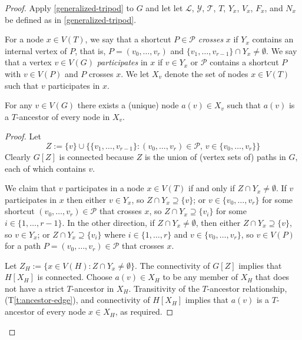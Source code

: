 \documentclass{patmorin}
\newcommand{\tref}[1]{(T\ref{t:#1})}
\begin{document}
\begin{proof}
Apply \cref{generalized-tripod} to $G$ and let 
let $\mathcal{L}$, $\mathcal{Y}$, $\mathcal{T}$, $T$, $Y_x$, $V_x$, $F_x$, and $N_x$ be defined as in \cref{generalized-tripod}.

For a node $x\in V(T)$, we say that a shortcut $P\in\mathcal{P}$ \emph{crosses} $x$ if $Y_x$ contains an internal vertex of $P$, that is, $P=(v_0,\ldots,v_r)$ and $\{v_1,\ldots,v_{r-1}\}\cap Y_x\neq\emptyset$.  We say that a vertex $v\in V(G)$ \emph{participates} in $x$ if $v\in Y_x$ or $\mathcal{P}$ contains a shortcut $P$ with $v\in V(P)$ and $P$ crosses $x$. We let $X_v$ denote the set of nodes $x\in V(T)$ such that $v$ participates in $x$.

\begin{clm}\label{x-v-ancestor}
  For any $v\in V(G)$ there exists a (unique) node $a(v)\in X_v$ such that
  $a(v)$ is a $T$-ancestor of every node in $X_v$.
\end{clm}

\begin{proof}
  Let 
  \[
     Z := \{v\} \cup \{\{v_1,\ldots,v_{r-1}\}:\mbox{$(v_0,\ldots,v_r)\in\mathcal{P}$, $v\in \{v_0,\ldots,v_r\}$}\}
  \]
  Clearly $G[Z]$ is connected because $Z$ is the union of (vertex sets of) paths in $G$, each of which contains $v$. 
  
  We claim that $v$ participates in a node $x\in V(T)$ if and only if $Z\cap Y_x\neq\emptyset$.  If $v$ participates in $x$ then either $v\in Y_x$, so $Z\cap Y_x\supseteq\{v\}$; or $v\in \{v_0,\ldots,v_r\}$ for some shortcut $(v_0,\ldots,v_r)\in\mathcal{P}$ that crosses $x$, so $Z\cap Y_x\supseteq \{v_i\}$ for some $i\in\{1,\ldots,r-1\}$.  In the other direction, if $Z\cap Y_x\neq\emptyset$, then either $Z\cap Y_x\supseteq \{v\}$, so $v\in Y_x$; or $Z\cap Y_x\supseteq \{v_i\}$ where $i\in\{1,\ldots,r\}$ and $v\in\{v_0,\ldots,v_r\}$, so $v\in V(P)$ for a path $P=(v_0,\ldots,v_r)\in\mathcal{P}$ that crosses $x$. 

  Let $Z_H:=\{x\in V(H): Z\cap Y_x\neq\emptyset\}$.  The connectivity of $G[Z]$ implies that $H[X_H]$ is connected.  
  Choose $a(v)\in X_H$ to be any member of $X_H$ that does not have a strict $T$-ancestor in $X_H$.  Transitivity of the $T$-ancestor relationship, \tref{ancestor-edge}, and connectivity of $H[X_H]$ implies that $a(v)$ is a $T$-ancestor of every node $x\in X_H$, as required.
\end{proof}


\end{proof}
\end{document}
